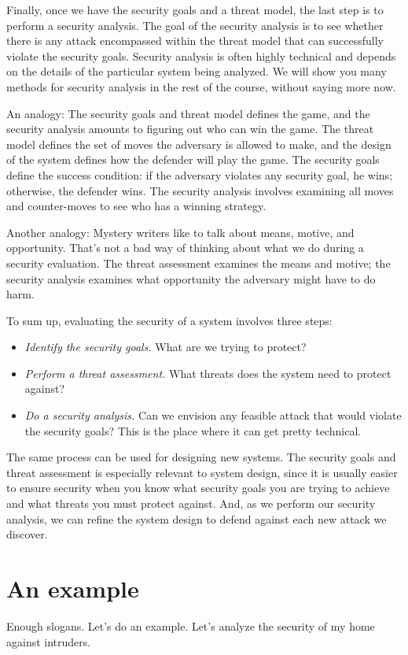 \documentclass[11pt]{article}
\begin{document}
Finally, once we have the security goals and a
threat model, the last step is to perform a security analysis. The
goal of the security analysis is to see whether there is any attack
encompassed within the threat model that can successfully violate the
security goals. Security analysis is often highly technical and
depends on the details of the particular system being analyzed. We
will show you many methods for security analysis in the rest of the
course, without saying more now. 

An analogy: The security goals and
threat model defines the game, and the security analysis amounts to
figuring out who can win the game. The threat model defines the set of
moves the adversary is allowed to make, and the design of the system
defines how the defender will play the game. The security goals define
the success condition: if the adversary violates any security goal, he
wins; otherwise, the defender wins. The security analysis involves
examining all moves and counter-moves to see who has a winning
strategy. 

Another analogy: Mystery writers like to talk about means,
motive, and opportunity. That's not a bad way of thinking about what
we do during a security evaluation. The threat assessment examines the
means and motive; the security analysis examines what opportunity the
adversary might have to do harm. 

To sum up, evaluating the security
of a system involves three steps:
\begin{itemize}
\item {\em Identify the security goals.} What are we trying to protect?
\item {\em Perform a threat assessment.} What threats does the system need to protect against?
\item {\em Do a security analysis.} Can we envision any feasible attack that
would violate the security goals? This is the place where it can get
pretty technical.
\end{itemize}

The same process can be used for designing new
systems. The security goals and threat assessment is especially
relevant to system design, since it is usually easier to ensure
security when you know what security goals you are trying to achieve
and what threats you must protect against. And, as we perform our
security analysis, we can refine the system design to defend against
each new attack we discover.

\section{An example}
Enough slogans. Let's
do an example. Let's analyze the security of my home against
intruders.
\end{document}
